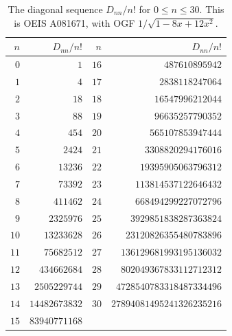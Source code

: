 \documentclass[11pt,a4paper]{article}
\theoremstyle{definition}
\theoremstyle{plain}
\begin{document}
\begin{table}[p]
\centering
\caption{The diagonal sequence $D_{nn}/n!$ for $0 \le n \le 30$.
This is OEIS A081671, with OGF $1/\sqrt{1-8x+12x^2}$.}
\label{tab:diagonal}
\begin{tabular}{r|r||r|r}
$n$ & $D_{nn}/n!$ & $n$ & $D_{nn}/n!$ \\
\hline
$0$ & $1$ & $16$ & $487610895942$ \\
$1$ & $4$ & $17$ & $2838118247064$ \\
$2$ & $18$ & $18$ & $16547996212044$ \\
$3$ & $88$ & $19$ & $96635257790352$ \\
$4$ & $454$ & $20$ & $565107853947444$ \\
$5$ & $2424$ & $21$ & $3308820294176016$ \\
$6$ & $13236$ & $22$ & $19395905063796312$ \\
$7$ & $73392$ & $23$ & $113814537122646432$ \\
$8$ & $411462$ & $24$ & $668494299227072796$ \\
$9$ & $2325976$ & $25$ & $3929851838287363824$ \\
$10$ & $13233628$ & $26$ & $23120826355480783896$ \\
$11$ & $75682512$ & $27$ & $136129681993195136032$ \\
$12$ & $434662684$ & $28$ & $802049367833112712312$ \\
$13$ & $2505229744$ & $29$ & $4728540783318487334496$ \\
$14$ & $14482673832$ & $30$ & $27894081495241326235216$ \\
$15$ & $83940771168$ & & \\
\end{tabular}
\end{table}
\end{document}
